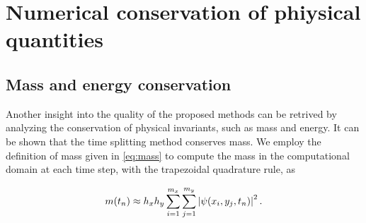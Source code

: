 \section{Numerical conservation of phiysical quantities}

\subsection{Mass and energy conservation}

Another insight into the quality of the proposed methods can be retrived by analyzing the conservation of physical invariants, such as mass and energy. It can be shown \cite{CZ18} that the time splitting method conserves mass. We employ the definition of mass given in \ref{eq:mass} to compute the mass in the computational domain at each time step, with the trapezoidal quadrature rule, as 

\[
    m(t_n) \approx h_x h_y \sum_{i=1}^{m_x} \sum_{j=1}^{m_y} \left| \psi(x_i, y_j, t_n) \right|^2.
\]







